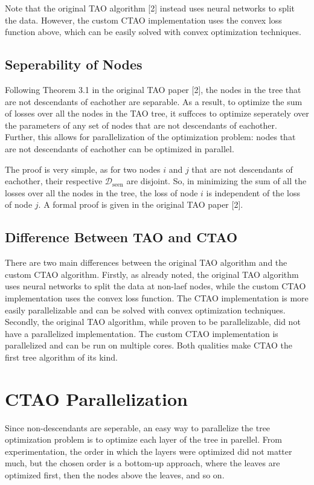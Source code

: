 \documentclass{article}
\begin{document}
Note that the original TAO algorithm [2] instead uses neural networks to split the data. However, the custom CTAO implementation uses the convex loss function above,
which can be easily solved with convex optimization techniques.

\subsection{Seperability of Nodes}

Following Theorem 3.1 in the original TAO paper [2], the nodes in the tree that are not descendants of eachother are separable.
As a result, to optimize the sum of losses over all the nodes in the TAO tree, it suffcces to optimize seperately over the parameters of any set of nodes 
that are not descendants of eachother. Further, this allows for parallelization of the optimization problem: nodes that are not descendants of eachother can be optimized in parallel.

The proof is very simple, as for two nodes $i$ and $j$ that are not descendants of eachother, their respective $\mathcal{D}_\text{seen}$ are disjoint. So, in minimizing 
the sum of all the losses over all the nodes in the tree, the loss of node $i$ is independent of the loss of node $j$. A formal proof is given in the original TAO paper [2].

\subsection{Difference Between TAO and CTAO}

There are two main differences between the original TAO algorithm and the custom CTAO algorithm. 
Firstly, as already noted, the original TAO algorithm uses neural networks to split the data at non-laef nodes, while the custom CTAO implementation uses the convex loss function. 
The CTAO implementation is more easily parallelizable and can be solved with convex optimization techniques.
Secondly, the original TAO algorithm, while proven to be parallelizable, did not have a parallelized implementation. The custom CTAO implementation is parallelized and can be run on multiple cores.
Both qualities make CTAO the first tree algorithm of its kind.


\section{CTAO Parallelization}

Since non-descendants are seperable, an easy way to parallelize the tree optimization problem is to optimize each layer of the tree in parellel.
From experimentation, the order in which the layers were optimized did not matter much, but the chosen order is a bottom-up approach, where the leaves are optimized first, then the nodes above the leaves, and so on.
\end{document}
